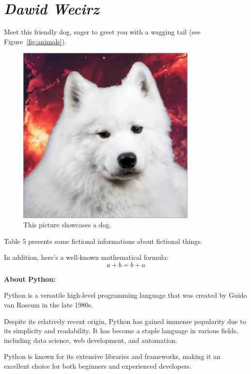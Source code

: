 \section{\textit{Dawid Wecirz}}
\label{sec:dwecirz}

Meet this friendly dog, eager to greet you with a wagging tail (see Figure~\ref{fig:animals}).
\begin{figure}[H]
    \centering
    \includegraphics[width=0.8\textwidth]{pictures/pic_DW.png} 
    \caption{This picture showcases a dog.}
    \label{fig:dog}
\end{figure}

Table 5 presents some fictional informations about fictional things.

\begin{table}[H]
    \centering
    
\end{table}

In addition, here's a well-known mathematical formula: \[a+b=b+a\]

\textbf{About Python:\\}

Python is a versatile high-level programming language that was created by Guido van Rossum in the late 1980s.

Despite its relatively recent origin, Python has gained immense popularity due to its simplicity and readability. It has become a staple language in various fields, including data science, web development, and automation.

Python is known for its extensive libraries and frameworks, making it an excellent choice for both beginners and experienced developers.

